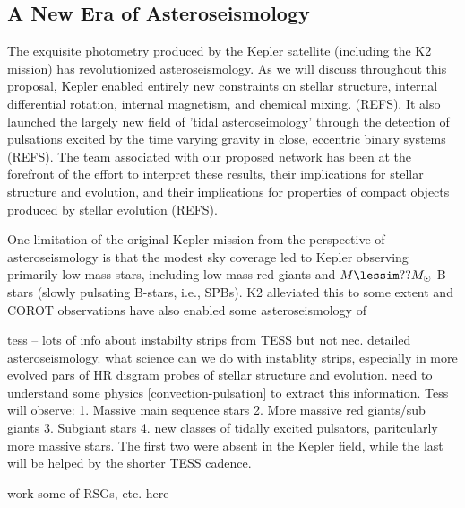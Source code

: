 {\color{blue}
\subsection{A New Era of Asteroseismology}

The exquisite photometry produced by the Kepler satellite (including the K2 mission) has revolutionized asteroseismology.   As we will discuss throughout this proposal, Kepler enabled entirely new constraints on stellar structure, internal differential rotation, internal magnetism, and chemical mixing. (REFS).  It also launched the largely new field of 'tidal asteroseimology' through the detection of pulsations  excited by the time varying gravity in close, eccentric binary systems (REFS). The team associated with our proposed network has been at the forefront of the effort to interpret these results, their implications for stellar structure and evolution, and their implications for properties of compact objects produced by stellar evolution (REFS).   

One limitation of the original Kepler mission from the perspective of asteroseismology is that the modest sky coverage led to Kepler observing primarily low mass stars, including low mass red giants and $M \lessim ?? M_\odot$ B-stars (slowly pulsating B-stars, i.e., SPBs).  K2 alleviated this to some extent and COROT observations have also enabled some asteroseismology of 

tess -- lots of info about instabilty strips from TESS but not nec. detailed asteroseismology.  what science can we do with instablity strips, especially in more evolved pars of HR disgram  probes of stellar structure and evolution.   need to understand some physics [convection-pulsation] to extract this information.   Tess will observe: 1. Massive main sequence stars 2. More massive red giants/sub giants 3. Subgiant stars 4.  new classes of tidally excited pulsators, paritcularly more massive stars.   The first two were absent in the Kepler field, while the last will be helped by the shorter TESS cadence.

work some of RSGs, etc. here




}